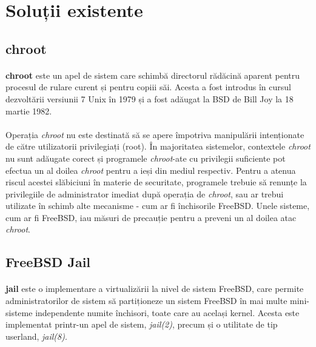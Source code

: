 
\section{Soluții existente}
    \subsection{chroot}
        \paragraph{} \textbf{chroot} este un apel de sistem care schimbă directorul rădăcină aparent pentru procesul de rulare curent și pentru copiii săi. Acesta a fost introdus în cursul dezvoltării versiunii 7 Unix în 1979 și a fost adăugat la BSD de Bill Joy la 18 martie 1982. \cite{kamp2000jails}
        \paragraph{} Operația \textit{chroot} nu este destinată să se apere împotriva manipulării intenționate de către utilizatorii privilegiați (root). În majoritatea sistemelor, contextele \textit{chroot} nu sunt adăugate corect și programele \textit{chroot}-ate cu privilegii suficiente pot efectua un al doilea \textit{chroot} pentru a ieși din mediul respectiv. Pentru a atenua riscul acestei slăbiciuni în materie de securitate, programele trebuie să renunțe la privilegiile de administrator imediat după operația de \textit{chroot}, sau ar trebui utilizate în schimb alte mecanisme - cum ar fi închisorile FreeBSD. Unele sisteme, cum ar fi FreeBSD, iau măsuri de precauție pentru a preveni un al doilea atac \textit{chroot}. \cite{freebsd:chroot}

    \subsection{FreeBSD Jail}
        \paragraph{} \textbf{jail} este o implementare a virtualizării la nivel de sistem FreeBSD, care permite administratorilor de sistem să partiționeze un sistem FreeBSD în mai multe mini-sisteme independente numite închisori, toate care au același kernel. \cite{jail} Acesta este implementat printr-un apel de sistem, \textit{jail(2)}, precum și o utilitate de tip userland, \textit{jail(8)}. \cite{wiki:jail}

